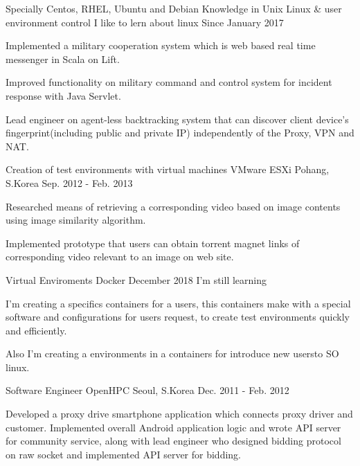 \begin{cventries}
	\cventry
	{Specially Centos, RHEL, Ubuntu and Debian}
	{Knowledge in Unix Linux \& user environment control}
	{I like to lern about linux }
	{Since January 2017 }
	{
	\begin{cvitems}
		\item {Implemented a military cooperation system which is web based real time messenger in Scala on Lift.}
		\item {Improved functionality on military command and control system for incident response with Java Servlet.}
		\item {Lead engineer on agent-less backtracking system that can discover client device's fingerprint(including public and private IP) independently of the Proxy, VPN and NAT.}
	\end{cvitems}
}
  \cventry
    {Creation of test environments with virtual machines}
    {VMware ESXi }
    {Pohang, S.Korea}
    {Sep. 2012 - Feb. 2013}
    {
      \begin{cvitems}
        \item {Researched means of retrieving a corresponding video based on image contents using image similarity algorithm.}
        \item {Implemented prototype that users can obtain torrent magnet links of corresponding video relevant to an image on web site.}
      \end{cvitems} 
    }
  \cventry
    {Virtual Enviroments}
    {Docker}
    {December 2018}
    {I'm still learning}
    {
      \begin{cvitems}
        \item {I'm creating a specifics containers for a users, this containers make with a special software and configurations for users request, to create test environments quickly and efficiently.
        \item Also I'm creating a environments in a containers for introduce new usersto SO linux.}
      \end{cvitems}
    }
  \cventry
    {Software Engineer}
    {OpenHPC}
    {Seoul, S.Korea}
    {Dec. 2011 - Feb. 2012}
    {
      \begin{cvitems}
        \item {Developed a proxy drive smartphone application which connects proxy driver and customer. Implemented overall Android application logic and wrote API server for community service, along with lead engineer who designed bidding protocol on raw socket and implemented API server for bidding.}
      \end{cvitems}
    }

    
\end{cventries}
